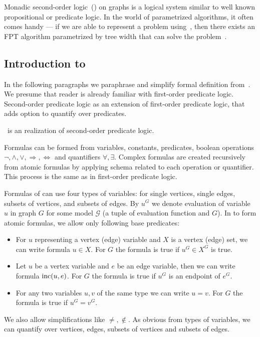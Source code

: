 Monadic second-order logic~(\MSO{}) on graphs is a logical system similar to
well known propositional or predicate logic.
In the world of parametrized algorithms,
it often comes handy --- if we are able to represent a problem using~\MSO{},
then there exists an FPT algorithm parametrized by tree width
that can solve the problem~\cite{tree_width_mso}.

\subsection{Introduction to~\MSO{}}

In the following paragraphs we paraphrase and simplify formal definition
from~\cite{book_parametrized_algorithms}.
We presume that reader is already familiar with first-order predicate logic.
Second-order predicate logic as an extension of first-order predicate logic,
that adds option to quantify over predicates.

\MSO{}~is an realization of second-order predicate logic.
\todo[inline]
{ TODO Switch to footnote, currently, it raises exceptions in NVim ;)

	We need second-order logic as quantification over subsets of vertices or edges
	corresponds to quantification over predicates separating the subsets.
	Without this requirement we could talk
	about monadic first-order logic \( \text{MSO}_1 \).
}

Formulas can be formed from
variables, constants, predicates,
boolean operations \( \lnot, \land, \lor, \Rightarrow, \Leftrightarrow \)
and quantifiers \( \forall, \exists \).
Complex formulas are created recursively from atomic formulas
by applying schema related to each operation or quantifier.
This process is the same as in first-order predicate logic.

Formulas of \MSO{} can use four types of variables:
for single vertices, single edges, subsets of vertices, and subsets of edges.
By \( u^G \) we denote evaluation of variable \( u \) in graph \( G \)
for some model \( \mathcal{G} \) (a tuple of evaluation function and \( G \)).
In \MSO{} to form atomic formulas, we allow only following base predicates:
%
\begin{itemize}
	\item For \( u \) representing a vertex (edge) variable
	      and \( X \) is a vertex (edge) set,
	      we can write formula \( u \in X \).
	      For \( G \) the formula is true if \( u^G \in X^G \) is true.
	\item Let \( u \) be a vertex variable and \( e \) be an edge variable,
	      then we can write formula \( \text{inc} (u, e) \).
	      For \( G \) the formula is true if \( u^G \) is an endpoint of \( e^G \).
	\item For any two variables \( u, v \) of the same type we can write \( u = v \).
	      For \( G \) the formula is true if \( u^G = v^G \).
\end{itemize}
%
We also allow simplifications like \( \ne, \not\in \).
As obvious from types of variables, we can quantify over vertices, edges,
subsets of vertices and subsets of edges.

